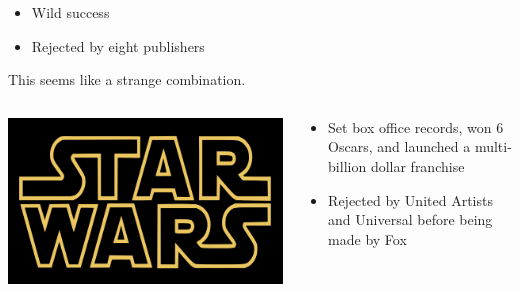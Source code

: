 \documentclass[aspectratio=169]{beamer}
\begin{document}
\begin{frame}
\begin{columns}
   \pause
   
     \begin{block}{}
       \begin{itemize}
         \item Wild success
         \item Rejected by eight publishers\\
       \end{itemize}
       This seems like a strange combination.
     \end{block}
  \end{columns}

\end{frame}
\begin{frame}

  \begin{columns}
     \begin{block}{}
       \includegraphics[width=\textwidth]{figures/star-wars}
     \end{block}
   
     \begin{block}{}
       \begin{itemize}
         \item Set box office records, won 6 Oscars, and launched a multi-billion dollar franchise
         \item Rejected by United Artists and Universal before being made by Fox
       \end{itemize}
     \end{block}
  \end{columns}

\end{frame}
\end{document}
